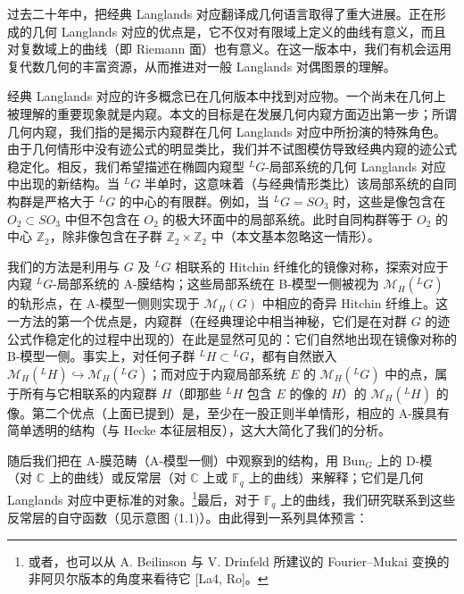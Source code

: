 \documentclass[11pt,a4paper]{article}
\newcommand{\Bun}{\mathrm{Bun}}
\begin{document}
过去二十年中，把经典 Langlands 对应翻译成几何语言取得了重大进展。正在形成的几何 Langlands 对应的优点是，它不仅对有限域上定义的曲线有意义，而且对复数域上的曲线（即 Riemann 面）也有意义。在这一版本中，我们有机会运用复代数几何的丰富资源，从而推进对一般 Langlands 对偶图景的理解。

经典 Langlands 对应的许多概念已在几何版本中找到对应物。一个尚未在几何上被理解的重要现象就是内窥。本文的目标是在发展几何内窥方面迈出第一步；所谓几何内窥，我们指的是揭示内窥群在几何 Langlands 对应中所扮演的特殊角色。由于几何情形中没有迹公式的明显类比，我们并不试图模仿导致经典内窥的迹公式稳定化。相反，我们希望描述在椭圆内窥型 ${}^{L}G$-局部系统的几何 Langlands 对应中出现的新结构。当 ${}^{L}G$ 半单时，这意味着（与经典情形类比）该局部系统的自同构群是严格大于 ${}^{L}G$ 的中心的有限群。例如，当 ${}^{L}G=SO_3$ 时，这些是像包含在 $O_2\subset SO_3$ 中但不包含在 $O_2$ 的极大环面中的局部系统。此时自同构群等于 $O_2$ 的中心 $\mathbb{Z}_2$，除非像包含在子群 $\mathbb{Z}_2\times\mathbb{Z}_2$ 中（本文基本忽略这一情形）。

我们的方法是利用与 $G$ 及 ${}^{L}G$ 相联系的 Hitchin 纤维化的镜像对称，探索对应于内窥 ${}^{L}G$-局部系统的 A-膜结构；这些局部系统在 B-模型一侧被视为 $\mathcal{M}_H({}^{L}G)$ 的轨形点，在 A-模型一侧则实现于 $\mathcal{M}_H(G)$ 中相应的奇异 Hitchin 纤维上。这一方法的第一个优点是，内窥群（在经典理论中相当神秘，它们是在对群 $G$ 的迹公式作稳定化的过程中出现的）在此是显然可见的：它们自然地出现在镜像对称的 B-模型一侧。事实上，对任何子群 ${}^{L}H\subset{}^{L}G$，都有自然嵌入 $\mathcal{M}_H({}^{L}H)\hookrightarrow\mathcal{M}_H({}^{L}G)$；而对应于内窥局部系统 $E$ 的 $\mathcal{M}_H({}^{L}G)$ 中的点，属于所有与它相联系的内窥群 $H$（即那些 ${}^{L}H$ 包含 $E$ 的像的 $H$）的 $\mathcal{M}_H({}^{L}H)$ 的像。第二个优点（上面已提到）是，至少在一股正则半单情形，相应的 A-膜具有简单透明的结构（与 Hecke 本征层相反），这大大简化了我们的分析。


随后我们把在 A-膜范畴（A-模型一侧）中观察到的结构，用 $\Bun_G$ 上的 D-模（对 $\mathbb{C}$ 上的曲线）或反常层（对 $\mathbb{C}$ 上或 $\mathbb{F}_q$ 上的曲线）来解释；它们是几何 Langlands 对应中更标准的对象。\footnote{或者，也可以从 A. Beilinson 与 V. Drinfeld 所建议的 Fourier--Mukai 变换的非阿贝尔版本的角度来看待它 [La4, Ro]。}最后，对于 $\mathbb{F}_q$ 上的曲线，我们研究联系到这些反常层的自守函数（见示意图 (1.1)）。由此得到一系列具体预言：
\end{document}

